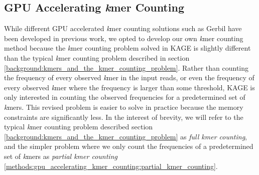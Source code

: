 \subsection{GPU Accelerating \textit{k}mer Counting}
While different GPU accelerated \textit{k}mer counting solutions such as Gerbil \cite{gerbil} have been developed in previous work, we opted to develop our own \textit{k}mer counting method because the \textit{k}mer counting problem solved in KAGE is slightly different than the typical \textit{k}mer counting problem described in section \ref{background:kmers_and_the_kmer_counting_problem}.
Rather than counting the frequency of every observed \textit{k}mer in the input reads, or even the frequency of every observed \textit{k}mer where the frequency is larger than some threshold, KAGE is only interested in counting the observed frequencies for a predetermined set of \textit{k}mers.
This revised problem is easier to solve in practice because the memory constraints are significantly less.
In the interest of brevity, we will refer to the typical \textit{k}mer counting problem described section \ref{background:kmers_and_the_kmer_counting_problem} as \textit{full kmer counting}, and the simpler problem where we only count the frequencies of a predetermined set of \textit{k}mers as \textit{partial kmer counting} \ref{methods:gpu_accelerating_kmer_counting:partial_kmer_counting}.


